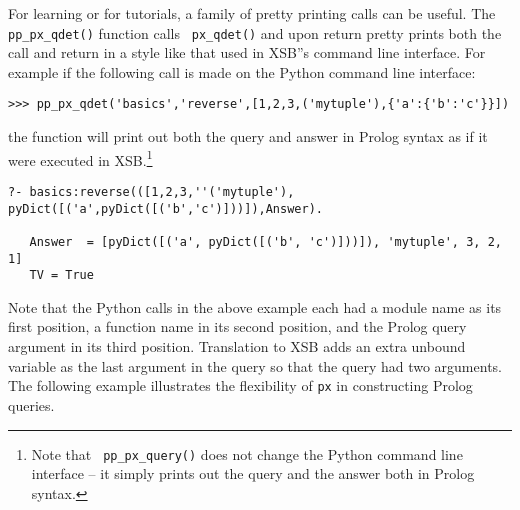 \begin{example}
For learning \px{} or for tutorials, a family of pretty printing calls
can be useful.  The {\tt pp\_px\_qdet()} function calls {\tt
  px\_qdet()} and upon return pretty prints both the call and return
in a style like that used in XSB''s command line interface.  For
example if the following call is made on the Python command line
interface:

\begin{verbatim}
>>> pp_px_qdet('basics','reverse',[1,2,3,('mytuple'),{'a':{'b':'c'}}])
\end{verbatim}
\noindent
the function will print out both the query and answer in Prolog syntax
as if it were executed in XSB.\footnote{Note that {\tt
    pp\_px\_query()} does not change the Python command line interface
  -- it simply prints out the query and the answer both in Prolog
  syntax.}

\begin{verbatim}
?- basics:reverse(([1,2,3,''('mytuple'), pyDict([('a',pyDict([('b','c')]))]),Answer).

   Answer  = [pyDict([('a', pyDict([('b', 'c')]))]), 'mytuple', 3, 2, 1]
   TV = True
\end{verbatim}
\end{example}

Note that the Python calls in the above example each had a module name
as its first position, a function name in its second position, and the
Prolog query argument in its third position.  Translation to XSB adds
an extra unbound variable as the last argument in the query so that
the query had two arguments.  The following example illustrates the
flexibility of {\tt px} in constructing Prolog queries.

